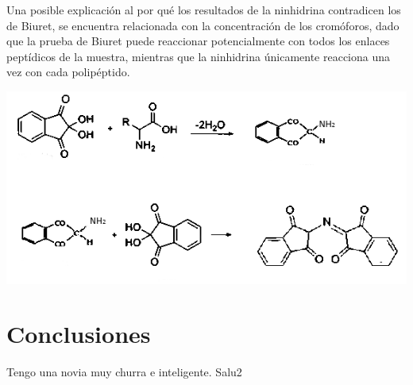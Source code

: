 \documentclass[fleqn,10pt]{SelfArx}
\begin{document}
	Una posible explicaci\'on al por qu\'e los resultados de la ninhidrina contradicen los de Biuret, se encuentra relacionada con la concentraci\'on de los crom\'oforos, dado que la prueba de Biuret puede reaccionar potencialmente con todos los enlaces pept\'idicos de la muestra, mientras que la ninhidrina \'unicamente reacciona una vez con cada polip\'eptido.
	\begin{scheme}[h]
		\centering
		\includegraphics[width=\linewidth]{ninhydrin}
		\caption{Reacci\'on de los amino\'acidos con la ninhidrina.}
		\label{sch: ninhidrina}
	\end{scheme}

\section{Conclusiones}
	Tengo una novia muy churra e inteligente. Salu2





\end{document}
